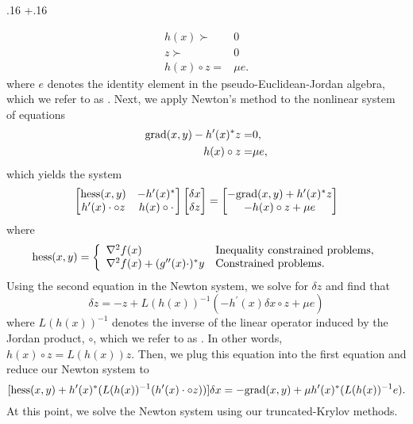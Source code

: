 \documentclass{report}
\makeatletter
\DeclareRobustCommand*{\textct}[1]{%
  \begingroup\@activeus\scantokens{\texttt{#1}\endinput}\endgroup}
\newcommand{\textctref}[1]{\hyperref[itm:#1]{\textct{#1}}}
\newenvironment{boldlist}
    {\begin{list}{}{
        \labelwidth.16\textwidth
        \leftmargin\dimexpr\leftmargin+.16\textwidth
        \renewcommand\makelabel[1]{%
            \textbf{##1}}}}
    {\vspace{-\dimexpr\baselineskip+2\itemsep}\end{list}}
\makeatother
\begin{document}
\begin{boldlist}
{\begin{align*}
        h(x)\succ & 0\\
        z \succ & 0\\
        h(x) \circ z = & \mu e.
    \end{align*} 
    where $e$ denotes the identity element in the pseudo-Euclidean-Jordan algebra, which we refer to as \textctref{id}.  Next, we apply Newton's method to the nonlinear system of equations
    \begin{align*} 
        \textnormal{grad}(x,y) - h^\prime(x)^*z =& 0,\\
        h(x) \circ z = & \mu e,
    \end{align*}
    which yields the system
    $$
        \begin{bmatrix}
            \textnormal{hess}(x,y) & - h^\prime(x)^*\\
            h^\prime(x) \cdot \circ z  & h(x)\circ \cdot
        \end{bmatrix}
        \begin{bmatrix}
            \delta x\\
            \delta z
        \end{bmatrix}
        =
        \begin{bmatrix}
            -\textnormal{grad}(x,y) + h^\prime(x)^*z\\
            -h(x) \circ z + \mu e
        \end{bmatrix}
    $$
    where
    $$
        \textnormal{hess}(x,y) = \left\{
            \begin{array}{ll}
                \nabla^2 f(x) & \textnormal{Inequality constrained problems,}\\
                \nabla^2 f(x) + (g^{\prime\prime}(x)\cdot)^*y & \textnormal{Constrained problems.}
            \end{array}\right.
    $$
    Using the second equation in the Newton system, we solve for $\delta z$ and find that
    $$
        \delta z =  -z + L(h(x))^{-1} (-h^\prime(x) \delta x \circ z + \mu e)
    $$
where $L(h(x))^{-1}$ denotes the inverse of the linear operator induced by the Jordan product, $\circ$, which we refer to as \textctref{linv}.  In other words, $h(x)\circ z=L(h(x))z$.  Then, we plug this equation into the first equation and reduce our Newton system to
    $$
        [\textnormal{hess}(x,y) + h^\prime(x)^* (L(h(x))^{-1} (h^\prime(x) \cdot \circ z)) ] \delta x =  -\textnormal{grad}(x,y) + \mu h^\prime(x)^* (L(h(x))^{-1} e).
    $$
    At this point, we solve the Newton system using our truncated-Krylov methods.

}
\end{boldlist}
\end{document}
